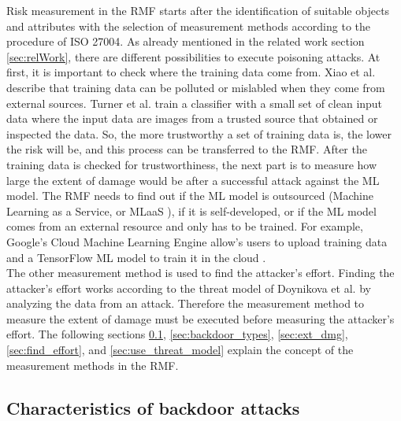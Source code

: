 Risk measurement in the RMF starts after the identification of suitable objects and attributes with the selection of measurement methods according to the procedure of ISO 27004. As already mentioned in
the related work section \ref{sec:relWork}, there are different possibilities to execute poisoning attacks. At first, it is important to check where the training data come from. Xiao et al.
\cite{DBLP:conf/sp/XiaoLZX18} describe that training data can be polluted or mislabled when they come from external sources. Turner et al. \cite{turner2018clean} train a classifier with a small set of
clean input data where the input data are images from a trusted source that obtained or inspected the data. So, the more trustworthy a set of training data is, the lower the risk will be, and this
process can be transferred to the RMF. After the training data is checked for trustworthiness, the next part is to measure how large the extent of damage would be after a successful attack against the
ML model. The RMF needs to find out if the ML model is outsourced (Machine Learning as a Service, or MLaaS \cite{DBLP:journals/corr/abs-1708-06733}), if it is self-developed, or if the ML model comes
from an external resource and only has to be trained. For example, Google's Cloud Machine Learning Engine \cite{google_ai2022} allow's users to upload training data and a TensorFlow ML model to train it
in the cloud \cite{DBLP:journals/corr/abs-1708-06733}. \\ The other measurement method is used to find the attacker's effort. Finding the attacker's effort works according to the threat model of
Doynikova et al. \cite{DBLP:conf/crisis/DoynikovaNGK20} by analyzing the data from an attack. Therefore the measurement method to measure the extent of damage must be executed before measuring the
attacker's effort. The following sections \ref{sec:charac_backdoor}, \ref{sec:backdoor_types}, \ref{sec:ext_dmg}, \ref{sec:find_effort}, and \ref{sec:use_threat_model} explain the concept of the
measurement methods in the RMF.

\subsection{Characteristics of backdoor attacks}
\label{sec:charac_backdoor}

